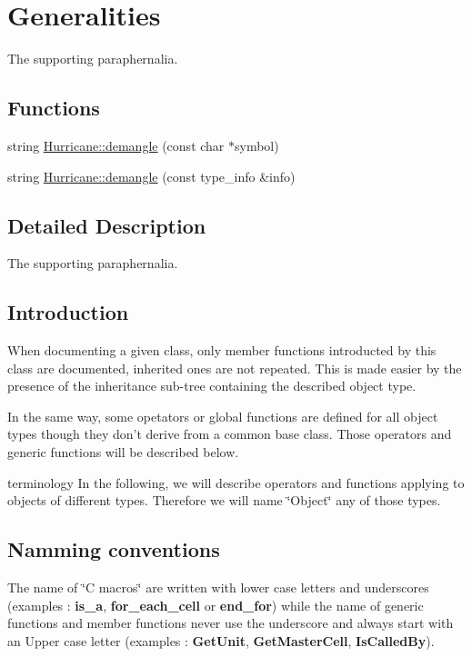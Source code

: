 \hypertarget{group__Generalities}{\section{Generalities}
\label{group__Generalities}
}


The supporting paraphernalia.  


\subsection*{Functions}
\begin{DoxyCompactItemize}
\item 
string \hyperlink{group__Generalities_ga93af87d1b7b19294382ba6dae51d0363}{Hurricane\-::demangle} (const char $\ast$symbol)
\item 
string \hyperlink{group__Generalities_gae4be209e8a3f2227b0c7a22246817c6f}{Hurricane\-::demangle} (const type\-\_\-info \&info)
\end{DoxyCompactItemize}


\subsection{Detailed Description}
The supporting paraphernalia. \hypertarget{group__Generalities_secGeneralitiesIntro}{}\subsection{Introduction}\label{group__Generalities_secGeneralitiesIntro}
When documenting a given class, only member functions introducted by this class are documented, inherited ones are not repeated. This is made easier by the presence of the inheritance sub-\/tree containing the described object type.

In the same way, some opetators or global functions are defined for all object types though they don't derive from a common base class. Those operators and generic functions will be described below.

terminology In the following, we will describe operators and functions applying to objects of different types. Therefore we will name \char`\"{}\-Object\char`\"{} any of those types.\hypertarget{group__Generalities_secGeneralitiesNammingConventions}{}\subsection{Namming conventions}\label{group__Generalities_secGeneralitiesNammingConventions}
The name of \char`\"{}\-C macros\char`\"{} are written with lower case letters and underscores (examples \-: {\bfseries is\-\_\-a}, {\bfseries for\-\_\-each\-\_\-cell} or {\bfseries end\-\_\-for}) while the name of generic functions and member functions never use the underscore and always start with an Upper case letter (examples \-: {\bfseries Get\-Unit}, {\bfseries Get\-Master\-Cell}, {\bfseries Is\-Called\-By}).

